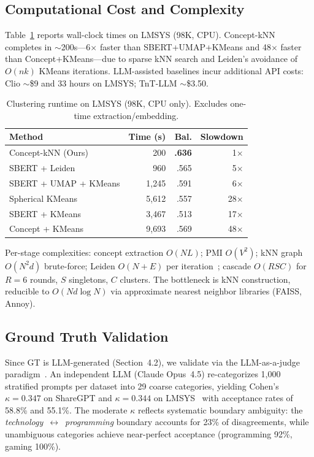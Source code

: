 \documentclass[conference]{IEEEtran}
\begin{document}
\subsection{Computational Cost and Complexity}

Table~\ref{tab:runtime} reports wall-clock times on LMSYS (98K, CPU). Concept-kNN completes in $\sim$200s---6$\times$ faster than SBERT+UMAP+KMeans and 48$\times$ faster than Concept+KMeans---due to sparse kNN search and Leiden's avoidance of $O(nk)$ KMeans iterations. LLM-assisted baselines incur additional API costs: Clio $\sim$\$9 and 33 hours on LMSYS; TnT-LLM $\sim$\$3.50.

\begin{table}[t]
\caption{Clustering runtime on LMSYS (98K, CPU only). Excludes one-time extraction/embedding.}
\label{tab:runtime}
\centering
\footnotesize
\begin{tabular}{@{}lrrr@{}}
\toprule
\textbf{Method} & \textbf{Time (s)} & \textbf{Bal.} & \textbf{Slowdown} \\
\midrule
Concept-kNN (Ours) & 200 & \textbf{.636} & 1$\times$ \\
SBERT + Leiden & 960 & .565 & 5$\times$ \\
SBERT + UMAP + KMeans & 1,245 & .591 & 6$\times$ \\
Spherical KMeans & 5,612 & .557 & 28$\times$ \\
SBERT + KMeans & 3,467 & .513 & 17$\times$ \\
Concept + KMeans & 9,693 & .569 & 48$\times$ \\
\bottomrule
\end{tabular}
\end{table}

Per-stage complexities: concept extraction $O(NL)$; PMI $O(V^2)$; kNN graph $O(N^2 d)$ brute-force; Leiden $O(N + E)$ per iteration~\cite{traag2019leiden}; cascade $O(RSC)$ for $R{=}6$ rounds, $S$ singletons, $C$ clusters. The bottleneck is kNN construction, reducible to $O(Nd\log N)$ via approximate nearest neighbor libraries (FAISS, Annoy).

\subsection{Ground Truth Validation}

Since GT is LLM-generated (Section~4.2), we validate via the LLM-as-a-judge paradigm~\cite{zheng2024judge, gilardi2023chatgpt}. An independent LLM (Claude Opus~4.5) re-categorizes 1,000 stratified prompts per dataset into 29 coarse categories, yielding Cohen's $\kappa = 0.347$ on ShareGPT and $\kappa = 0.344$ on LMSYS~\cite{landis1977kappa} with acceptance rates of 58.8\% and 55.1\%. The moderate $\kappa$ reflects systematic boundary ambiguity: the \textit{technology}~$\leftrightarrow$~\textit{programming} boundary accounts for 23\% of disagreements, while unambiguous categories achieve near-perfect acceptance (programming 92\%, gaming 100\%).
\end{document}
